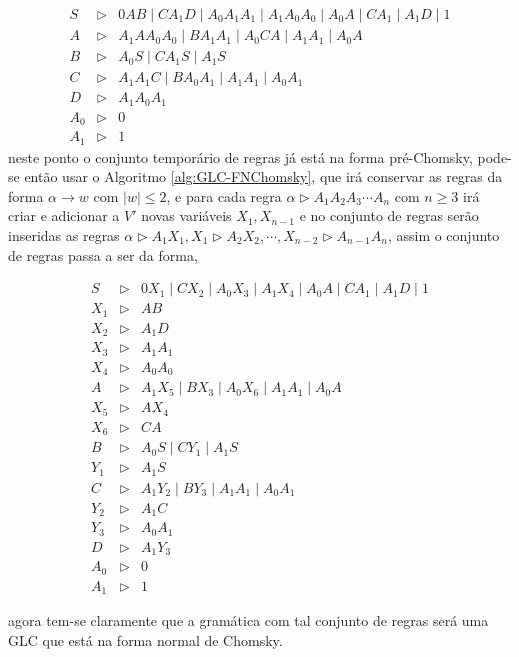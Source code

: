 \begin{example}
    \begin{eqnarray*}
        S & \rhd & 0AB \mid CA_1D \mid A_0A_1A_1 \mid A_1A_0A_0 \mid A_0A \mid CA_1 \mid A_1D \mid 1\\
        A & \rhd & A_1AA_0A_0 \mid BA_1A_1 \mid A_0CA \mid A_1A_1 \mid A_0A\\
        B & \rhd & A_0S \mid CA_1S \mid A_1S\\
        C & \rhd & A_1A_1C \mid BA_0A_1 \mid A_1A_1 \mid A_0A_1\\
        D & \rhd & A_1A_0A_1\\
        A_0 & \rhd & 0 \\
        A_1 & \rhd & 1
    \end{eqnarray*}
    neste ponto o conjunto temporário de regras já está na forma pré-Chomsky, pode-se então usar o Algoritmo \ref{alg:GLC-FNChomsky}, que irá conservar as regras da forma $\alpha \rightarrow w$ com $|w| \leq 2$, e  para cada regra $\alpha \rhd A_1A_2A_3\cdots A_n$ com $n \geq 3$ irá criar e adicionar a $V'$ novas variáveis $X_1, X_{n-1}$ e no conjunto de regras serão inseridas as regras $\alpha \rhd A_1X_1, X_1 \rhd A_2X_2, \cdots, X_{n-2} \rhd A_{n-1}A_n$, assim o conjunto de regras passa a ser da forma,
    
    \begin{eqnarray*}
        S & \rhd & 0X_1 \mid CX_2 \mid A_0X_3 \mid A_1X_4 \mid A_0A \mid CA_1 \mid A_1D \mid 1\\
        X_1 & \rhd & AB \\
        X_2 & \rhd & A_1D\\
        X_3 & \rhd & A_1A_1\\
        X_4 & \rhd & A_0A_0\\
        A & \rhd & A_1X_5 \mid BX_3 \mid A_0X_6 \mid A_1A_1 \mid A_0A\\
        X_5 & \rhd & AX_4\\
        X_6 & \rhd & CA\\
        B & \rhd & A_0S \mid CY_1 \mid A_1S\\
        Y_1 & \rhd & A_1S\\
        C & \rhd & A_1Y_2 \mid BY_3 \mid A_1A_1 \mid A_0A_1\\
        Y_2 & \rhd & A_1C\\
        Y_3 & \rhd & A_0A_1\\
        D & \rhd & A_1Y_3\\
        A_0 & \rhd & 0 \\
        A_1 & \rhd & 1
    \end{eqnarray*}
    
    agora tem-se claramente que a gramática com tal conjunto de regras será uma GLC que está na forma normal de Chomsky. 
\end{example}

